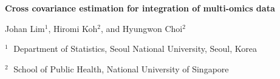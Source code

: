\documentclass[12pt]{article}
\begin{document}
\begin{flushleft}


{\LARGE\bf Cross covariance estimation for integration of multi-omics data}


\vspace{1.0cm}

Johan Lim$^1$, Hiromi Koh$^2$, and Hyungwon Choi$^{2}$ 

\begin{description}

\item $^1 \;$ Department of Statistics, Seoul National University, Seoul, Korea

\item $^2 \;$ School of Public Health, National University of Singapore


\end{description}

\end{flushleft}


\vspace{0.75cm}
\end{document}
